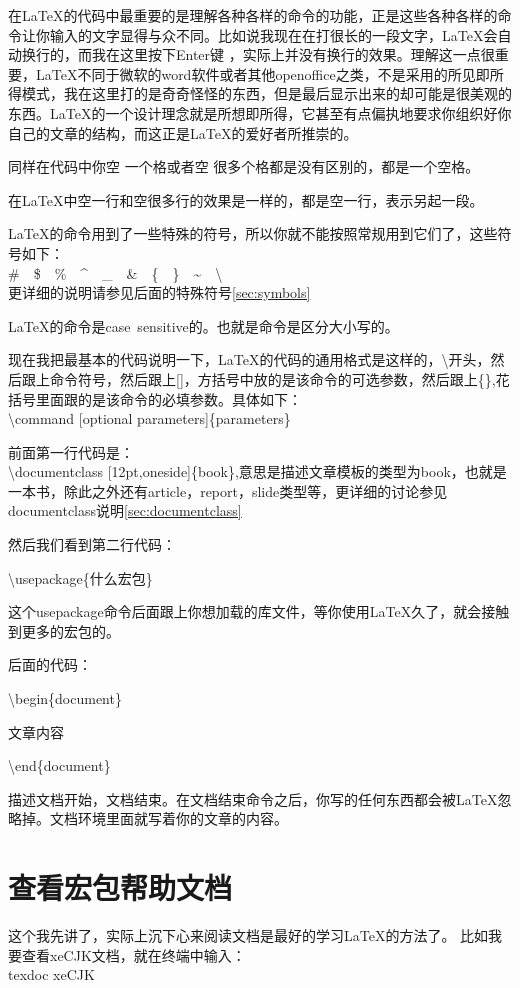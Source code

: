 \documentclass[12pt,oneside]{book}
\begin{document}
\begin{common-format}
在\LaTeX 的代码中最重要的是理解各种各样的命令的功能，正是这些各种各样的命令让你输入的文字显得与众不同。比如说我现在在打很长的一段文字，\LaTeX 会自动换行的，而我在这里按下Enter键
，实际上并没有换行的效果。理解这一点很重要，\LaTeX 不同于微软的word软件或者其他openoffice之类，不是采用的所见即所得模式，我在这里打的是奇奇怪怪的东西，但是最后显示出来的却可能是很美观的东西。\LaTeX 的一个设计理念就是所想即所得，它甚至有点偏执地要求你组织好你自己的文章的结构，而这正是\LaTeX 的爱好者所推崇的。

同样在代码中你空 一个格或者空      很多个格都是没有区别的，都是一个空格。

在\LaTeX 中空一行和空很多行的效果是一样的，都是空一行，表示另起一段。

\LaTeX 的命令用到了一些特殊的符号，所以你就不能按照常规用到它们了，这些符号如下：\\
\#~~\$~~\%~~\^~~\_~~\&~~\{~~\}~~\~~~\textbackslash \\
更详细的说明请参见后面的特殊符号\ref{sec:symbols}

\LaTeX 的命令是case~sensitive的。也就是命令是区分大小写的。

现在我把最基本的代码说明一下，\LaTeX 的代码的通用格式是这样的，\textbackslash 开头，然后跟上命令符号，然后跟上[]，方括号中放的是该命令的可选参数，然后跟上\{\},花括号里面跟的是该命令的必填参数。具体如下：\\
\textbackslash command [optional parameters]\{parameters\}

前面第一行代码是：\\
\textbackslash documentclass [12pt,oneside]\{book\},意思是描述文章模板的类型为book，也就是一本书，除此之外还有article，report，slide类型等，更详细的讨论参见documentclass说明\ref{sec:documentclass}

然后我们看到第二行代码：

\textbackslash usepackage\{什么宏包\}

这个usepackage命令后面跟上你想加载的库文件，等你使用\LaTeX 久了，就会接触到更多的宏包的。

后面的代码：

\textbackslash begin\{document\}

文章内容

\textbackslash end\{document\}

描述文档开始，文档结束。在文档结束命令之后，你写的任何东西都会被\LaTeX 忽略掉。文档环境里面就写着你的文章的内容。

\section{查看宏包帮助文档}
这个我先讲了，实际上沉下心来阅读文档是最好的学习\LaTeX 的方法了。
比如我要查看xeCJK文档，就在终端中输入：\\
texdoc xeCJK


\end{common-format}
\end{document}
